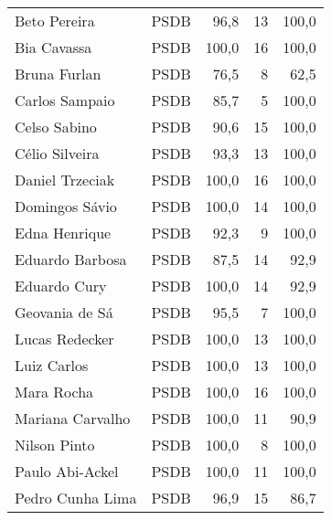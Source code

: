 \begin{longtable}{llrrr}
                        Beto Pereira &           PSDB &      96,8 &           13 &      100,0 \\
                         Bia Cavassa &           PSDB &     100,0 &           16 &      100,0 \\
                        Bruna Furlan &           PSDB &      76,5 &            8 &       62,5 \\
                      Carlos Sampaio &           PSDB &      85,7 &            5 &      100,0 \\
                        Celso Sabino &           PSDB &      90,6 &           15 &      100,0 \\
                      Célio Silveira &           PSDB &      93,3 &           13 &      100,0 \\
                     Daniel Trzeciak &           PSDB &     100,0 &           16 &      100,0 \\
                      Domingos Sávio &           PSDB &     100,0 &           14 &      100,0 \\
                       Edna Henrique &           PSDB &      92,3 &            9 &      100,0 \\
                     Eduardo Barbosa &           PSDB &      87,5 &           14 &       92,9 \\
                        Eduardo Cury &           PSDB &     100,0 &           14 &       92,9 \\
                      Geovania de Sá &           PSDB &      95,5 &            7 &      100,0 \\
                      Lucas Redecker &           PSDB &     100,0 &           13 &      100,0 \\
                         Luiz Carlos &           PSDB &     100,0 &           13 &      100,0 \\
                          Mara Rocha &           PSDB &     100,0 &           16 &      100,0 \\
                    Mariana Carvalho &           PSDB &     100,0 &           11 &       90,9 \\
                        Nilson Pinto &           PSDB &     100,0 &            8 &      100,0 \\
                     Paulo Abi-Ackel &           PSDB &     100,0 &           11 &      100,0 \\
                    Pedro Cunha Lima &           PSDB &      96,9 &           15 &       86,7 \\

\end{longtable}
